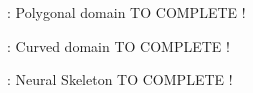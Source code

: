 \begin{frame}{\appendixname~\theappendixframenumber~: Polygonal domain}
	TO COMPLETE !
\end{frame}
\addtocounter{appendixframenumber}{1}

\begin{frame}{\appendixname~\theappendixframenumber~: Curved domain}
	TO COMPLETE !
\end{frame}
\addtocounter{appendixframenumber}{1}

\begin{frame}{\appendixname~\theappendixframenumber~: Neural Skeleton}
	TO COMPLETE !
\end{frame}
\addtocounter{appendixframenumber}{1}